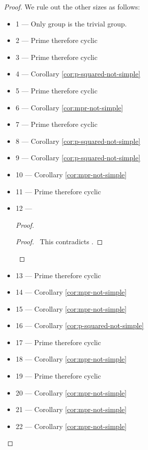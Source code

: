 \begin{proof}
\pf
We rule out the other sizes as follows:
\begin{itemize}
\item 1 --- Only group is the trivial group.
\item 2 --- Prime therefore cyclic
\item 3 --- Prime therefore cyclic
\item 4 --- Corollary \ref{cor:p-squared-not-simple}
\item 5 --- Prime therefore cyclic
\item 6 --- Corollary \ref{cor:mpr-not-simple}
\item 7 --- Prime therefore cyclic
\item 8 --- Corollary \ref{cor:p-squared-not-simple}
\item 9 --- Corollary \ref{cor:p-squared-not-simple}
\item 10 --- Corollary \ref{cor:mpr-not-simple}
\item 11 --- Prime therefore cyclic
\item 12 ---
\begin{proof}
	\qedstep
	\begin{proof}
		\pf\ This contradicts .
	\end{proof}
\end{proof}
\item 13 --- Prime therefore cyclic
\item 14 --- Corollary \ref{cor:mpr-not-simple}
\item 15 --- Corollary \ref{cor:mpr-not-simple}
\item 16 --- Corollary \ref{cor:p-squared-not-simple}
\item 17 --- Prime therefore cyclic
\item 18 --- Corollary \ref{cor:mpr-not-simple}
\item 19 --- Prime therefore cyclic
\item 20 --- Corollary \ref{cor:mpr-not-simple}
\item 21 --- Corollary \ref{cor:mpr-not-simple}
\item 22 --- Corollary \ref{cor:mpr-not-simple}

\end{itemize}
\end{proof}
